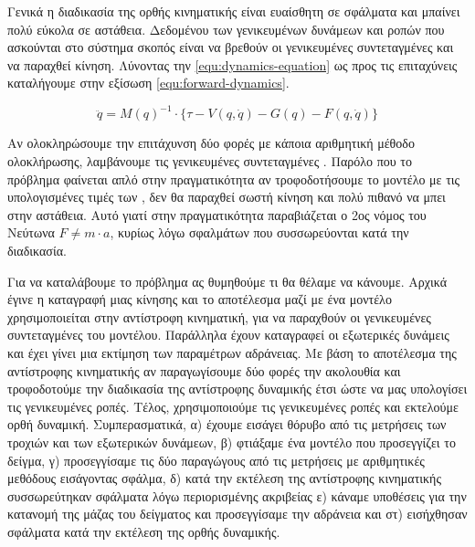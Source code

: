 Γενικά η διαδικασία της ορθής κινηματικής είναι ευαίσθητη σε σφάλματα και μπαίνει πολύ εύκολα σε αστάθεια. Δεδομένου των γενικευμένων δυνάμεων και ροπών που ασκούνται στο σύστημα σκοπός είναι να βρεθούν οι γενικευμένες συντεταγμένες  και να παραχθεί κίνηση. Λύνοντας την \ref{equ:dynamics-equation} ως προς τις επιταχύνεις καταλήγουμε στην εξίσωση \ref{equ:forward-dynamics}.

\begin{equation}
    \ddot{q} = M(q)^{-1} \cdot \{ \tau - V(q, \dot{q}) - G(q) - F(q, \dot{q})\}
    \label{equ:forward-dynamics}
\end{equation}

Αν ολοκληρώσουμε την επιτάχυνση δύο φορές με κάποια αριθμητική μέθοδο ολοκλήρωσης, λαμβάνουμε τις γενικευμένες συντεταγμένες . Παρόλο που το πρόβλημα φαίνεται απλό στην πραγματικότητα αν τροφοδοτήσουμε το μοντέλο με τις υπολογισμένες τιμές των , δεν θα παραχθεί σωστή κίνηση και πολύ πιθανό να μπει στην αστάθεια. Αυτό γιατί στην πραγματικότητα παραβιάζεται ο 2ος νόμος του Νεύτωνα $F \neq m \cdot a$, κυρίως λόγω σφαλμάτων που συσσωρεύονται κατά την διαδικασία.

Για να καταλάβουμε το πρόβλημα ας θυμηθούμε τι θα θέλαμε να κάνουμε. Αρχικά έγινε η καταγραφή μιας κίνησης και το αποτέλεσμα μαζί με ένα μοντέλο χρησιμοποιείται στην αντίστροφη κινηματική, για να παραχθούν οι γενικευμένες συντεταγμένες του μοντέλου. Παράλληλα έχουν καταγραφεί οι εξωτερικές δυνάμεις και έχει γίνει μια εκτίμηση των παραμέτρων αδράνειας. Με βάση το αποτέλεσμα της αντίστροφης κινηματικής αν παραγωγίσουμε δύο φορές την ακολουθία και τροφοδοτούμε την διαδικασία της αντίστροφης δυναμικής έτσι ώστε να μας υπολογίσει τις γενικευμένες ροπές. Τέλος, χρησιμοποιούμε τις γενικευμένες ροπές και εκτελούμε ορθή δυναμική. Συμπερασματικά, α) έχουμε εισάγει θόρυβο από τις μετρήσεις των τροχιών και των εξωτερικών δυνάμεων, β) φτιάξαμε ένα μοντέλο που προσεγγίζει το δείγμα, γ) προσεγγίσαμε τις δύο παραγώγους από τις μετρήσεις με αριθμητικές μεθόδους εισάγοντας σφάλμα, δ) κατά την εκτέλεση της αντίστροφης κινηματικής συσσωρεύτηκαν σφάλματα λόγω περιορισμένης ακριβείας ε) κάναμε υποθέσεις για την κατανομή της μάζας του δείγματος και προσεγγίσαμε την αδράνεια και στ) εισήχθησαν σφάλματα κατά την εκτέλεση της ορθής δυναμικής.
